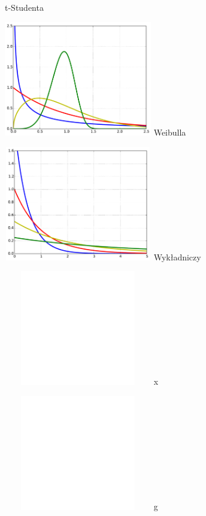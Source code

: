 \begin{multicols}{3}
\begin{Figure}
 t-Studenta
\end{Figure}
\begin{Figure} \centering
 \includegraphics[width=183pt, height=142pt]{img/weibull}
 Weibulla
\end{Figure}
\begin{Figure} \centering
 \includegraphics[width=183pt, height=142pt]{img/exp}
 Wykładniczy
\end{Figure}
\begin{Figure} \centering
 \includegraphics[width=183pt, height=142pt]{img/empty}
 {\color{white}x}
\end{Figure}
\begin{Figure} \centering
 \includegraphics[width=183pt, height=142pt]{img/empty}
 {\color{white}g}
\end{Figure}
\end{multicols}

